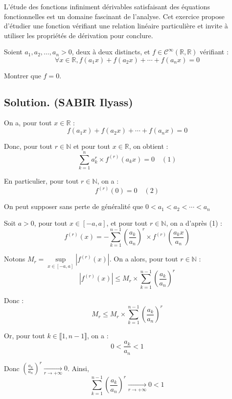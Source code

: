 L'{\'e}tude des fonctions infiniment d{\'e}rivables satisfaisant des
{\'e}quations fonctionnelles est un domaine fascinant de l'analyse. Cet
exercice propose d'{\'e}tudier une fonction v{\'e}rifiant une relation
lin{\'e}aire particuli{\`e}re et invite {\`a} utiliser les propri{\'e}t{\'e}s
de d{\'e}rivation pour conclure.
\begin{exercise}
Soient $a_1, a_2, \ldots, a_n > 0$, deux {\`a} deux distincts, et $f \in
\mathcal{C}^{\infty} (\mathbb{R}, \mathbb{R})$ v{\'e}rifiant :
\[ \forall x \in \mathbb{R}, f (a_1 x) + f (a_2 x) + \cdots + f (a_n x) = 0 \]

Montrer que $f = 0$.
\end{exercise}

\subsection*{Solution. (SABIR Ilyass)}

On a, pour tout $x \in \mathbb{R}$ :
\[ f (a_1 x) + f (a_2 x) + \cdots + f (a_n x) = 0 \]


Donc, pour tout $r \in \mathbb{N}$ et pour tout $x \in \mathbb{R}$, on obtient
:
\[ \sum_{k = 1}^n a_k^r \times f^{(r)} (a_k x) = 0 \quad (1) \]


En particulier, pour tout $r \in \mathbb{N}$, on a :
\[ f^{(r)} (0) = 0 \quad (2) \]


On peut supposer sans perte de g{\'e}n{\'e}ralit{\'e} que $0 < a_1 < a_2 <
\cdots < a_n$

Soit $a > 0$, pour tout $x \in [- a, a]$, et pour tout $r \in \mathbb{N}$, on
a d'apr{\`e}s (1) :
\[ f^{(r)} (x) = - \sum_{k = 1}^{n - 1} \left( \frac{a_k}{a_n} \right)^r
   \times f^{(r)} \left( \frac{a_k x}{a_n} \right) \]


Notons $M_r = \underset{x \in [- a, a]}{\sup}  |f^{(r)} (x) |$. On a alors,
pour tout $r \in \mathbb{N}$ :
\[ |f^{(r)} (x) | \leqslant M_r \times \sum_{k = 1}^{n - 1} \left(
   \frac{a_k}{a_n} \right)^r \]


Donc :
\[ M_r \leqslant M_r \times \sum_{k = 1}^{n - 1} \left( \frac{a_k}{a_n}
   \right)^r \]


Or, pour tout $k \in \llbracket 1, n - 1 \rrbracket$, on a :
\[ 0 < \frac{a_k}{a_n} < 1 \]


Donc $\left( \frac{a_k}{a_n} \right)^r \xrightarrow[r \to + \infty]{} 0$.
Ainsi,
\[ \sum_{k = 1}^{n - 1} \left( \frac{a_k}{a_n} \right)^r \xrightarrow[r \to +
   \infty]{} 0 < 1 \]


